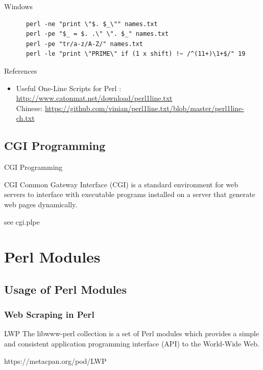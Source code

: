 \documentclass[UTF8]{beamer}
\begin{document}
\begin{frame}[fragile]{Windows}
    \begin{verbatim}
      perl -ne "print \"$. $_\"" names.txt
      perl -pe "$_ = $. .\" \". $_" names.txt
      perl -pe "tr/a-z/A-Z/" names.txt
      perl -le "print \"PRIME\" if (1 x shift) !~ /^(11+)\1+$/" 19
    \end{verbatim}
\end{frame}

\begin{frame}[t]{References}
    \begin{itemize}
        \item Useful One-Line Scripts for Perl : \url{http://www.catonmat.net/download/perl1line.txt} \\
        Chinese: \url{https://github.com/vinian/perl1line.txt/blob/master/perl1line-ch.txt}
    \end{itemize}
\end{frame}


\subsection{CGI Programming}
\begin{frame}[t]{CGI Programming}
    \begin{block}{CGI}
        Common Gateway Interface (CGI) is a standard environment for web servers to interface with executable programs installed on a server that generate web pages dynamically.
    \end{block}
    see cgi.plpe
\end{frame}


\section{Perl Modules}

\subsection{Usage of Perl Modules}

\begin{frame}
  \frametitle{Web Scraping in Perl}
  \begin{block}{LWP}
    The libwww-perl collection is a set of Perl modules which provides a simple
    and consistent application programming interface (API) to the World-Wide Web.

    https://metacpan.org/pod/LWP
  \end{block}
\end{frame}
\end{document}
